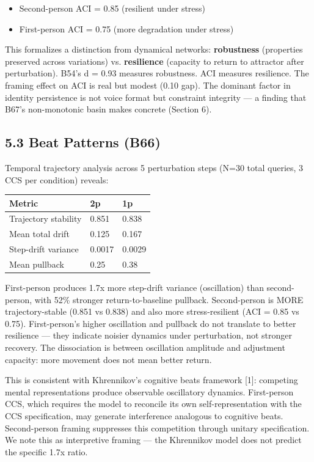 \documentclass[11pt]{article}
\begin{document}
\begin{itemize}
\item Second-person ACI = 0.85 (resilient under stress)
\item First-person ACI = 0.75 (more degradation under stress)
\end{itemize}

This formalizes a distinction from dynamical networks: \textbf{robustness} (properties
preserved across variations) vs. \textbf{resilience} (capacity to return to attractor
after perturbation). B54's d = 0.93 measures robustness. ACI measures resilience.
The framing effect on ACI is real but modest (0.10 gap). The dominant factor
in identity persistence is not voice format but constraint integrity --- a finding
that B67's non-monotonic basin makes concrete (Section 6).

\subsection{5.3 Beat Patterns (B66)}

Temporal trajectory analysis across 5 perturbation steps (N=30 total queries,
3 CCS per condition) reveals:

\begin{table}[h]\centering
\begin{tabular}{lll}
\toprule
Metric & 2p & 1p \\
\midrule
Trajectory stability & 0.851 & 0.838 \\
Mean total drift & 0.125 & 0.167 \\
Step-drift variance & 0.0017 & 0.0029 \\
Mean pullback & 0.25 & 0.38 \\
\bottomrule
\end{tabular}
\end{table}

First-person produces 1.7x more step-drift variance (oscillation) than
second-person, with 52\% stronger return-to-baseline pullback. Second-person
is MORE trajectory-stable (0.851 vs 0.838) and also more stress-resilient
(ACI = 0.85 vs 0.75). First-person's higher oscillation and pullback do not
translate to better resilience --- they indicate noisier dynamics under
perturbation, not stronger recovery. The dissociation is between oscillation
amplitude and adjustment capacity: more movement does not mean better return.

This is consistent with Khrennikov's cognitive beats framework [1]: competing
mental representations produce observable oscillatory dynamics. First-person
CCS, which requires the model to reconcile its own self-representation with
the CCS specification, may generate interference analogous to cognitive beats.
Second-person framing suppresses this competition through unitary specification.
We note this as interpretive framing --- the Khrennikov model does not predict
the specific 1.7x ratio.
\end{document}
